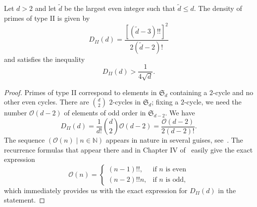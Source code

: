 \documentclass{book}
\newcommand{\NN}{\mathbb{N}}
\renewcommand{\SS}{\mathfrak{S}}
\begin{document}
\begin{proposition}\label{prop:type2}
  Let $d>2$ and let $\tilde{d}$ be the largest even integer such that 
  $\tilde{d}\leq d$.
  The density of primes of type II is given by
  \begin{equation*}
    D_{II}(d)=\frac{[(\tilde{d}-3)!!]^2}{2(\tilde{d}-2)!}
  \end{equation*}
  and satisfies the inequality
  \begin{equation*}
    D_{II}(d)>\frac{1}{4\sqrt{d}}.
  \end{equation*}
\end{proposition}
\begin{proof}
  Primes of type II correspond to elements in $\SS_d$ containing a $2$-cycle and no other
  even cycles. There are $\binom{d}{2}$ $2$-cycles in $\SS_d$; fixing a $2$-cycle, we 
  need the number $\mathscr{O}(d-2)$ of elements of odd order in $\SS_{d-2}$.
  We have
  \begin{equation*}
    D_{II}(d)=\frac{1}{d!}\binom{d}{2}\mathscr{O}(d-2)
    =\frac{\mathscr{O}(d-2)}{2(d-2)!}.
  \end{equation*}
  The sequence $(\mathscr{O}(n)\mid n\in\NN)$ appears in nature in several
  guises, see~\cite{OEIS}.  The recurrence formulas that appear there and in
  Chapter IV of~\cite{Riordan} easily give the exact expression
  \begin{equation*}
    \mathscr{O}(n)=\begin{cases}
        (n-1)!!,&\text{if }n\text{ is even}\\
        (n-2)!!n,&\text{if }n\text{ is odd,}
      \end{cases}
  \end{equation*}
  which immediately provides us with the 
  exact expression for $D_{II}(d)$ in the statement.


\end{proof}
\end{document}

